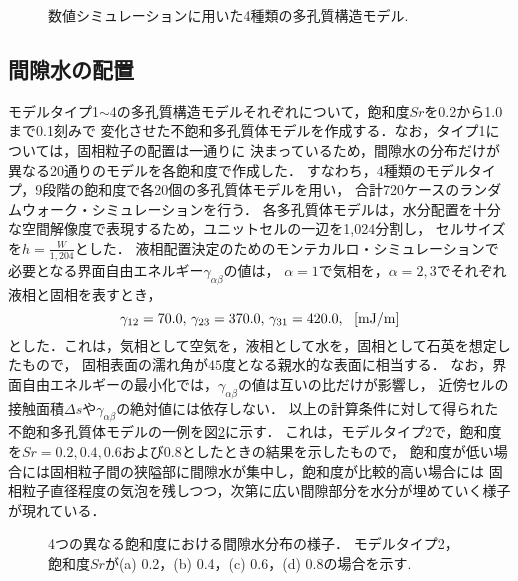 \begin{figure}[t]
\begin{center}
\caption{
	数値シミュレーションに用いた4種類の多孔質構造モデル. 
}
\label{fig:fig3}
\end{center}
\end{figure}
\subsection{間隙水の配置}
モデルタイプ1$\sim$4の多孔質構造モデルそれぞれについて，飽和度$Sr$を0.2から1.0まで0.1刻みで
変化させた不飽和多孔質体モデルを作成する．なお，タイプ1については，固相粒子の配置は一通りに
決まっているため，間隙水の分布だけが異なる20通りのモデルを各飽和度で作成した．
すなわち，4種類のモデルタイプ，9段階の飽和度で各20個の多孔質体モデルを用い，
合計720ケースのランダムウォーク・シミュレーションを行う．
各多孔質体モデルは，水分配置を十分な空間解像度で表現するため，ユニットセルの一辺を1,024分割し，
セルサイズを$h=\frac{W}{1,204}$とした．
液相配置決定のためのモンテカルロ・シミュレーションで必要となる界面自由エネルギー$\gamma_{\alpha\beta}$の値は，
$\alpha=1$で気相を，$\alpha=2,3$でそれぞれ液相と固相を表すとき，
\begin{equation}
	\gamma_{12}=70.0,\,  \gamma_{23}=370.0, \, \gamma_{31}=420.0, \ \ 
	[{\rm mJ/m}]
	\label{eqn:gamma_val} 
\end{equation}
とした\cite{Berkowitz}．これは，気相として空気を，液相として水を，固相として石英を想定したもので，
固相表面の濡れ角\cite{Gennes}が$45$度となる親水的な表面に相当する．
なお，界面自由エネルギーの最小化では，$\gamma_{\alpha\beta}$の値は互いの比だけが影響し，
近傍セルの接触面積$\Delta s$や$\gamma_{\alpha\beta}$の絶対値には依存しない．
以上の計算条件に対して得られた不飽和多孔質体モデルの一例を図\ref{fig:fig4}に示す．
これは，モデルタイプ2で，飽和度を$Sr=0.2,0.4,0.6$および$0.8$としたときの結果を示したもので，
飽和度が低い場合には固相粒子間の狭隘部に間隙水が集中し，飽和度が比較的高い場合には
固相粒子直径程度の気泡を残しつつ，次第に広い間隙部分を水分が埋めていく様子が現れている．
\begin{figure}[t]
\begin{center}
\caption{
	4つの異なる飽和度における間隙水分布の様子．
	モデルタイプ2，飽和度$Sr$が(a) 0.2，(b) 0.4，(c) 0.6，(d) 0.8の場合を示す. 
}
\label{fig:fig4}
\end{center}
\end{figure}
